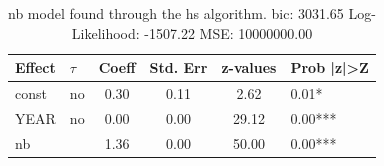 \begin{table}
	\caption{nb model found through the hs algorithm. bic: 3031.65 Log-Likelihood: -1507.22 MSE: 10000000.00}
	\begin{center}
		\begin{tabular}{|l|l|c|c|c|l|}
			\hline
			Effect & $\tau$ & Coeff & Std. Err & z-values & Prob |z|>Z \\
			\hline
			const & no & 0.30 & 0.11 & 2.62 & 0.01* \\
			\hline
			YEAR & no & 0.00 & 0.00 & 29.12 & 0.00*** \\
			\hline
			nb &  & 1.36 & 0.00 & 50.00 & 0.00*** \\
			\hline
		\end{tabular}
	\end{center}
\end{table}